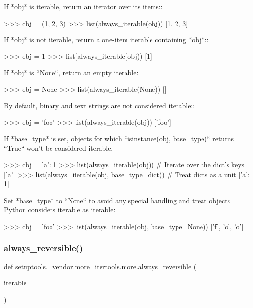 \begin{DoxyVerb}If *obj* is iterable, return an iterator over its items::

    >>> obj = (1, 2, 3)
    >>> list(always_iterable(obj))
    [1, 2, 3]

If *obj* is not iterable, return a one-item iterable containing *obj*::

    >>> obj = 1
    >>> list(always_iterable(obj))
    [1]

If *obj* is ``None``, return an empty iterable:

    >>> obj = None
    >>> list(always_iterable(None))
    []

By default, binary and text strings are not considered iterable::

    >>> obj = 'foo'
    >>> list(always_iterable(obj))
    ['foo']

If *base_type* is set, objects for which ``isinstance(obj, base_type)``
returns ``True`` won't be considered iterable.

    >>> obj = {'a': 1}
    >>> list(always_iterable(obj))  # Iterate over the dict's keys
    ['a']
    >>> list(always_iterable(obj, base_type=dict))  # Treat dicts as a unit
    [{'a': 1}]

Set *base_type* to ``None`` to avoid any special handling and treat objects
Python considers iterable as iterable:

    >>> obj = 'foo'
    >>> list(always_iterable(obj, base_type=None))
    ['f', 'o', 'o']
\end{DoxyVerb}
 \mbox{\label{namespacesetuptools_1_1__vendor_1_1more__itertools_1_1more_aea4fa17fcd6b2a3bac60640b73da5434}} 
\subsubsection{\texorpdfstring{always\+\_\+reversible()}{always\_reversible()}}
{\footnotesize\ttfamily def setuptools.\+\_\+vendor.\+more\+\_\+itertools.\+more.\+always\+\_\+reversible (\begin{DoxyParamCaption}\item[{}]{iterable }\end{DoxyParamCaption})}

